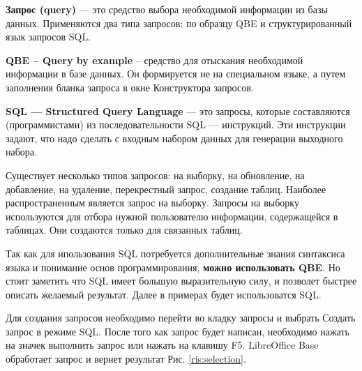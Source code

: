 \documentclass[a4paper]{article}
\begin{document}
\textbf{Запрос (query)} --- это средство выбора необходимой информации из базы данных. Применяются два типа запросов: по образцу QBE и структурированный язык запросов SQL.

\textbf{QBE – Query by example} – средство для отыскания необходимой информации в базе данных. Он формируется не на специальном языке, а путем заполнения бланка запроса в окне Конструктора запросов.

\textbf{SQL --- Structured Query Language} --- это запросы, которые составляются (программистами) из последовательности SQL --- инструкций. Эти инструкции задают, что надо сделать с входным набором данных для генерации выходного набора.

Существует несколько типов запросов: на выборку, на обновление, на добавление, на удаление, перекрестный запрос, создание таблиц. Наиболее распространенным является запрос на выборку. Запросы на выборку используются для отбора нужной пользователю информации, содержащейся в таблицах. Они создаются только для связанных таблиц.

Так как для ипользования SQL потребуется дополнительные знания синтаксиса языка и понимание основ программирования, \textbf{можно использовать QBE}. Но стоит заметить что SQL имеет большую выразительную силу, и позволет быстрее описать желаемый результат. Далее в примерах будет использоватся SQL.

Для создания запросов необходимо перейти во кладку запросы и выбрать Создать запрос в режиме SQL. После того как запрос будет написан, необходимо нажать на значек выполнить запрос или нажать на клавишу F5. LibreOffice Base обработает запрос и вернет результат Рис. \ref{ris:selection}.

\begin{figure}[h]
\end{figure}
\end{document}
